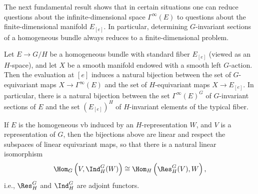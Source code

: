 The next fundamental result shows that in certain situations one can reduce questions about the infinite-dimensional space $\Gamma^\infty(E)$ to questions about the finite-dimensional manifold $E_{[e]}$. In particular, determining $G$-invariant sections of a homogeneous bundle always reduces to a finite-dimensional problem.

\begin{thm}\label{thm 1.4.4 Cap}
    Let $E\to G\slash H$ be a homogeneous bundle with standard fiber $E_{[e]}$ (viewed as an $H$-space), and let $X$ be a smooth manifold endowed with a smooth left $G$-action. Then the evaluation at $[e]$ induces a natural bijection between the set of $G$-equivariant maps $X\to \Gamma^\infty(E)$ and the set of $H$-equivariant maps $X\to E_{[e]}$. In particular, there is a natural bijection between the set $\Gamma^\infty(E)^G$ of $G$-invariant sections of $E$ and the set $(E_{[e]})^H$ of $H$-invariant elements of the typical fiber.

    If $E$ is the homogeneous \gls{vb} induced by an $H$-representation $W$, and $V$ is a representation of $G$, then the bijections above are linear and respect the subspaces of linear equivariant maps, so that there is a natural linear isomorphism
    \[\Hom_G\left(V,\Ind^G_H(W)\right)\cong \Hom_H\left(\Res^G_H(V),W\right),\]
    i.e., $\Res^G_H$ and $\Ind^G_H$ are adjoint functors.
\end{thm}
